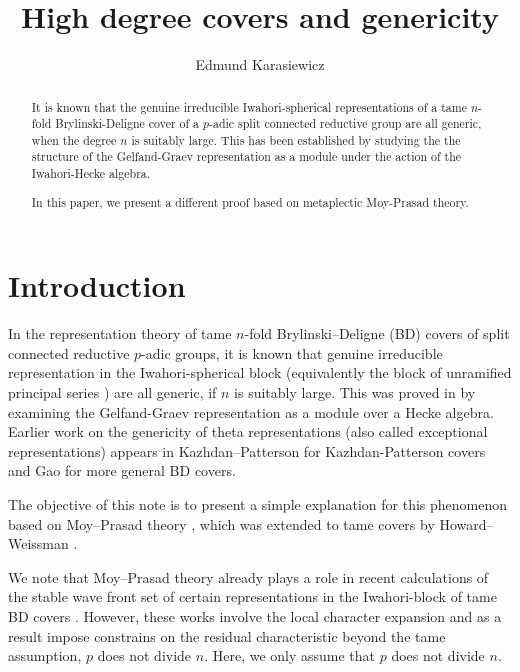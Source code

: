 \documentclass[11pt]{amsart}
\title[High degree covers and genericity]{High degree covers and genericity}
\author{Edmund Karasiewicz}
\theoremstyle{plain}
\theoremstyle{definition}
\numberwithin{equation}{section}
\begin{document}
\begin{abstract}
    It is known that the genuine irreducible Iwahori-spherical representations of a tame $n$-fold Brylinski-Deligne cover of a $p$-adic split connected reductive group are all generic, when the degree $n$ is suitably large. This has been established by studying the the structure of the Gelfand-Graev representation as a module under the action of the Iwahori-Hecke algebra.  
    
    In this paper, we present a different proof based on metaplectic Moy-Prasad theory. 
\end{abstract}

\maketitle


\setcounter{tocdepth}{1}


\section{Introduction}


In the representation theory of tame $n$-fold Brylinski--Deligne (BD) covers of split connected reductive $p$-adic groups, it is known that genuine irreducible representation in the Iwahori-spherical block (equivalently the block of unramified principal series \cite{S04}) are all generic, if $n$ is suitably large. This was proved in \cite{GGK24,GGK25} by examining the Gelfand-Graev representation as a module over a Hecke algebra. Earlier work on the genericity of theta representations (also called exceptional representations) appears in Kazhdan--Patterson \cite{KP84} for Kazhdan-Patterson covers and Gao \cite{Gao_theta_17} for more general BD covers.

The objective of this note is to present a simple explanation for this phenomenon based on Moy--Prasad theory \cite{MP94,MP96}, which was extended to tame covers by Howard--Weissman \cite{HW09}. 

We note that Moy--Prasad theory already plays a role in recent calculations of the stable wave front set of certain representations in the Iwahori-block of tame BD covers \cite{KOW26,Gao-Wang26}. However, these works involve the local character expansion and as a result impose constrains on the residual characteristic beyond the tame assumption, $p$ does not divide $n$. Here, we only assume that $p$ does not divide $n$. 
\end{document}
